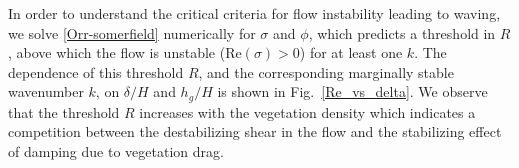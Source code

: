 \documentclass[12pt]{report}   %
\newcommand{\hg}{h_g}
\newcommand{\Rey}{{R}}
\begin{document}
In order to understand the critical criteria for flow instability leading to waving, we solve \eqref{Orr-somerfield} numerically for $\sigma$ and $\phi$, which predicts a threshold in $\Rey$, above which the flow is unstable (Re$(\sigma)>0$) for at least one $k$. 
The dependence of this threshold $\Rey$, and the corresponding marginally stable wavenumber $k$, on $\delta/H$ and $\hg/H$ is shown in Fig.~\ref{Re_vs_delta}. We observe that the threshold $\Rey$ increases with the vegetation density which indicates a competition between the destabilizing shear in the flow and the stabilizing effect of damping due to vegetation drag.
\end{document}
